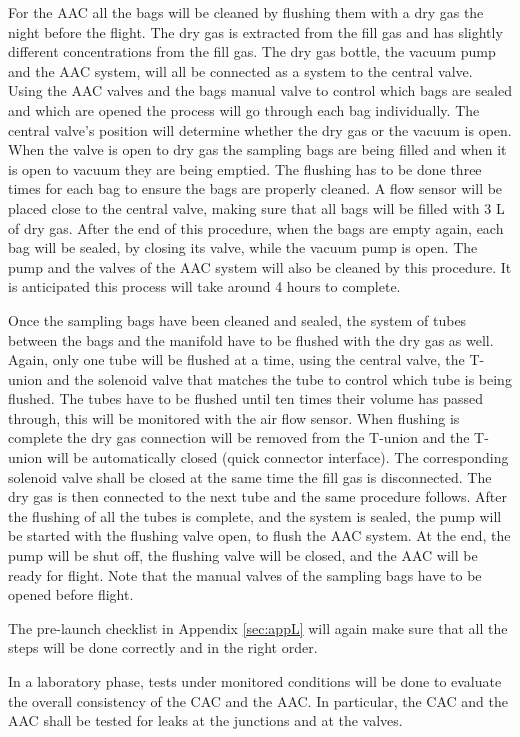 \documentclass[a4paper,12pt,twoside]{article}
\begin{document}
For the AAC all the bags will be cleaned by flushing them with a dry gas the night before the flight. The dry gas is extracted from the fill gas and has slightly different concentrations from the fill gas. The dry gas bottle, the vacuum pump and the AAC system, will all be connected as a system to the central valve. Using the AAC valves and the bags manual valve to control which bags are sealed and which are opened the process will go through each bag individually. The central valve's position will determine whether the dry gas or the vacuum is open. When the valve is open to dry gas the sampling bags are being filled and when it is open to vacuum they are being emptied. The flushing has to be done three times for each bag to ensure the bags are properly cleaned. A flow sensor will be placed close to the central valve, making sure that all bags will be filled with 3 L of dry gas. After the end of this procedure, when the bags are empty again, each bag will be sealed, by closing its valve, while the vacuum pump is open. The pump and the valves of the AAC system will also be cleaned by this procedure. It is anticipated this process will take around 4 hours to complete.

Once the sampling bags have been cleaned and sealed, the system of tubes between the bags and the manifold have to be flushed with the dry gas as well. Again, only one tube will be flushed at a time, using the central valve, the T-union and the solenoid valve that matches the tube to control which tube is being flushed. The tubes have to be flushed until ten times their volume has passed through, this will be monitored with the air flow sensor. When flushing is complete the dry gas connection will be removed from the T-union and the T-union will be automatically closed (quick connector interface). The corresponding solenoid valve shall be closed at the same time the fill gas is disconnected. The dry gas is then connected to the next tube and the same procedure follows. After the flushing of all the tubes is complete, and the system is sealed, the pump will be started with the flushing valve open, to flush the AAC system. At the end, the pump will be shut off, the flushing valve will be closed, and the AAC will be ready for flight. Note that the manual valves of the sampling bags have to be opened before flight.    

The pre-launch checklist in Appendix \ref{sec:appL} will again make sure that all the steps will be done correctly and in the right order. 

In a laboratory phase, tests under monitored conditions will be done to evaluate the overall consistency of the CAC and the AAC. In particular, the CAC and the AAC shall be tested for leaks at the junctions and at the valves. 
\end{document}
